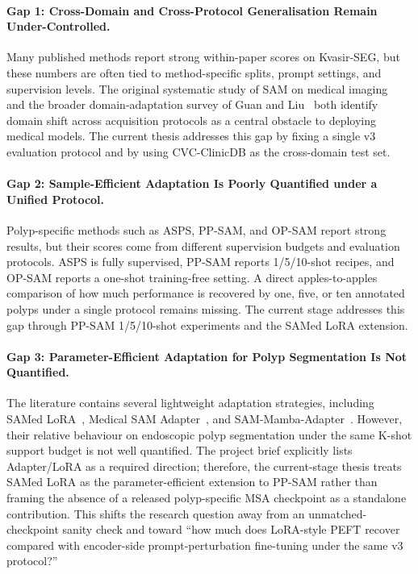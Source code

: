 \paragraph{Gap 1: Cross-Domain and Cross-Protocol Generalisation Remain Under-Controlled.}
Many published methods report strong within-paper scores on Kvasir-SEG, but these numbers are often tied to method-specific splits, prompt settings, and supervision levels. The original systematic study of SAM on medical imaging~\cite{mazurowski2023segmenting} and the broader domain-adaptation survey of Guan and Liu~\cite{guan2022tbme} both identify domain shift across acquisition protocols as a central obstacle to deploying medical models. The current thesis addresses this gap by fixing a single v3 evaluation protocol and by using CVC-ClinicDB as the cross-domain test set.

\paragraph{Gap 2: Sample-Efficient Adaptation Is Poorly Quantified under a Unified Protocol.}
Polyp-specific methods such as ASPS, PP-SAM, and OP-SAM report strong results, but their scores come from different supervision budgets and evaluation protocols. ASPS is fully supervised, PP-SAM reports 1/5/10-shot recipes, and OP-SAM reports a one-shot training-free setting. A direct apples-to-apples comparison of how much performance is recovered by one, five, or ten annotated polyps under a single protocol remains missing. The current stage addresses this gap through PP-SAM 1/5/10-shot experiments and the SAMed LoRA extension.

\paragraph{Gap 3: Parameter-Efficient Adaptation for Polyp Segmentation Is Not Quantified.}
The literature contains several lightweight adaptation strategies, including SAMed LoRA~\cite{zhang2023samed}, Medical SAM Adapter~\cite{wu2023medical}, and SAM-Mamba-Adapter~\cite{sammed2024}. However, their relative behaviour on endoscopic polyp segmentation under the same K-shot support budget is not well quantified. The project brief explicitly lists Adapter/LoRA as a required direction; therefore, the current-stage thesis treats SAMed LoRA as the parameter-efficient extension to PP-SAM rather than framing the absence of a released polyp-specific MSA checkpoint as a standalone contribution. This shifts the research question away from an unmatched-checkpoint sanity check and toward ``how much does LoRA-style PEFT recover compared with encoder-side prompt-perturbation fine-tuning under the same v3 protocol?''

